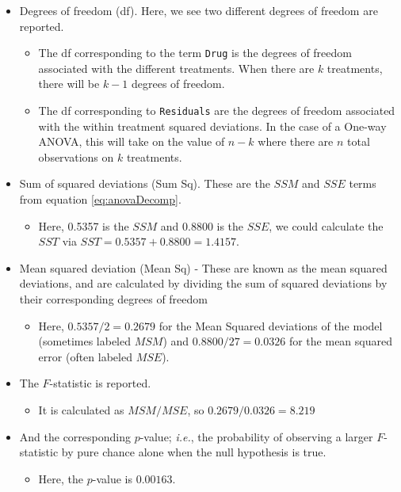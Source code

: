 \documentclass[
]{book}
\providecommand{\tightlist}{%
  \setlength{\itemsep}{0pt}\setlength{\parskip}{0pt}}
\begin{document}
\begin{itemize}
\tightlist
\item
  Degrees of freedom (df). Here, we see two different degrees of freedom are reported.

  \begin{itemize}
  \tightlist
  \item
    The df corresponding to the term \texttt{Drug} is the degrees of freedom associated with the different treatments. When there are \(k\) treatments, there will be \(k-1\) degrees of freedom.
  \item
    The df corresponding to \texttt{Residuals} are the degrees of freedom associated with the within treatment squared deviations. In the case of a One-way ANOVA, this will take on the value of \(n-k\) where there are \(n\) total observations on \(k\) treatments.
  \end{itemize}
\item
  Sum of squared deviations (Sum Sq). These are the \(SSM\) and \(SSE\) terms from equation \eqref{eq:anovaDecomp}.

  \begin{itemize}
  \tightlist
  \item
    Here, 0.5357 is the \(SSM\) and 0.8800 is the \(SSE\), we could calculate the \(SST\) via \(SST = 0.5357 + 0.8800 = 1.4157\).
  \end{itemize}
\item
  Mean squared deviation (Mean Sq) - These are known as the mean squared deviations, and are calculated by dividing the sum of squared deviations by their corresponding degrees of freedom

  \begin{itemize}
  \tightlist
  \item
    Here, \(0.5357/2 = 0.2679\) for the Mean Squared deviations of the model (sometimes labeled \(MSM\)) and \(0.8800/27 = 0.0326\) for the mean squared error (often labeled \(MSE\)).
  \end{itemize}
\item
  The \(F\)-statistic is reported.

  \begin{itemize}
  \tightlist
  \item
    It is calculated as \(MSM/MSE\), so \(0.2679/0.0326 = 8.219\)
  \end{itemize}
\item
  And the corresponding \(p\)-value; \emph{i.e.}, the probability of observing a larger \(F\)-statistic by pure chance alone when the null hypothesis is true.

  \begin{itemize}
  \tightlist
  \item
    Here, the \(p\)-value is \(0.00163\).
  \end{itemize}
\end{itemize}
\end{document}
